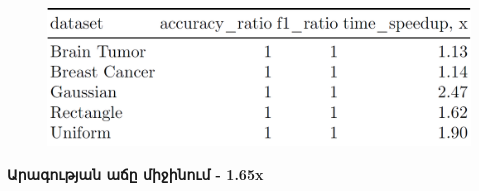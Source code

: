 \documentclass[aspectratio=169]{beamer}
\begin{document}
\begin{frame}
\begin{figure}
    \centering
    \includegraphics[width=1\linewidth]{speedup_groupby.png}
\end{figure}
\textbf{Արագության աճը միջինում - 1.65{\rm x}}
    
\end{frame}
\end{document}
